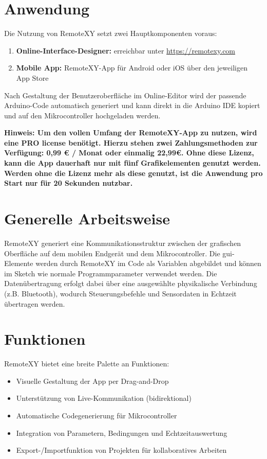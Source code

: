 \section{Anwendung}
Die Nutzung von RemoteXY setzt zwei Hauptkomponenten voraus:
\begin{enumerate}
	\item \textbf{Online-Interface-Designer:} erreichbar unter \url{https://remotexy.com}
	\item \textbf{Mobile App:} RemoteXY-App für Android oder iOS über den jeweiligen App Store
\end{enumerate}
Nach Gestaltung der Benutzeroberfläche im Online-Editor wird der passende Arduino-Code automatisch generiert und kann direkt in die Arduino IDE kopiert und auf den Mikrocontroller hochgeladen werden.


\textbf{Hinweis: Um den vollen Umfang der RemoteXY-App zu nutzen, wird eine \glqq PRO license \grqq{} benötigt. Hierzu stehen zwei Zahlungsmethoden zur Verfügung: 0,99 € / Monat oder einmalig 22,99€. Ohne diese Lizenz, kann die App dauerhaft nur mit fünf Grafikelementen genutzt werden. Werden ohne die Lizenz mehr als diese genutzt, ist die Anwendung pro Start nur für 20 Sekunden nutzbar.\cite{EVCodeLabs:2025g}}

\section{Generelle Arbeitsweise}
RemoteXY generiert eine Kommunikationsstruktur zwischen der grafischen Oberfläche auf dem mobilen Endgerät und dem Mikrocontroller. Die \ac{gui}-Elemente werden durch RemoteXY im Code als Variablen abgebildet und können im Sketch wie normale Programmparameter verwendet werden. Die Datenübertragung erfolgt dabei über eine ausgewählte physikalische Verbindung (z.B. Bluetooth), wodurch Steuerungsbefehle und Sensordaten in Echtzeit übertragen werden.

\section{Funktionen}

RemoteXY bietet eine breite Palette an Funktionen:

\begin{itemize}
	\item Visuelle Gestaltung der App per Drag-and-Drop
	\item Unterstützung von Live-Kommunikation (bidirektional)
	\item Automatische Codegenerierung für Mikrocontroller
	\item Integration von Parametern, Bedingungen und Echtzeitauswertung
	\item Export-/Importfunktion von Projekten für kollaboratives Arbeiten
\end{itemize}

